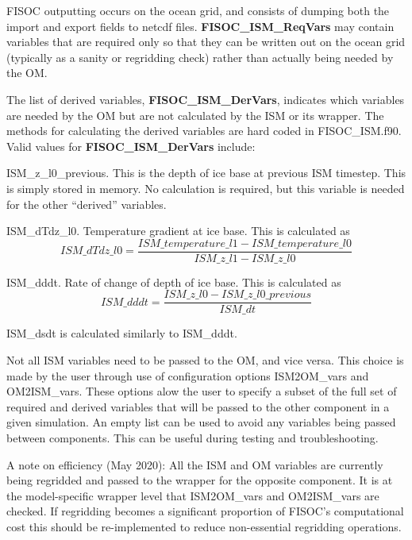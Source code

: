 \documentclass[11pt]{article}
\begin{document}
FISOC outputting occurs on the ocean grid, and consists of dumping both the import and 
export fields to netcdf files. 
\textbf{FISOC\_ISM\_ReqVars} may contain variables that are required only so that they can be written 
out on the ocean grid (typically as a sanity or regridding check) rather 
than actually being needed by the OM.

The list of derived variables, \textbf{FISOC\_ISM\_DerVars}, indicates which variables are needed by the 
OM but are not calculated by the ISM or its wrapper. 
The methods for calculating the derived variables are hard coded in FISOC\_ISM.f90. 
Valid values for  \textbf{FISOC\_ISM\_DerVars} include:

ISM\_z\_l0\_previous.  This is the depth of ice base at previous ISM timestep. This is simply stored 
in memory.  No calculation is required, but this variable is needed for the other ``derived'' variables. 

ISM\_dTdz\_l0.  Temperature gradient at ice base.  This is calculated as 
\begin{equation}
ISM\_dTdz\_l0 = \frac{ISM\_temperature\_l1 - ISM\_temperature\_l0}{ISM\_z\_l1 - ISM\_z\_l0}
\end{equation}

ISM\_dddt.  Rate of change of depth of ice base.  This is calculated as 
\begin{equation}
ISM\_dddt = \frac{ISM\_z\_l0 - ISM\_z\_l0\_previous}{ISM\_dt}
\end{equation}

ISM\_dsdt is calculated similarly to ISM\_dddt.

Not all ISM variables need to be passed to the OM, and vice versa.  
This choice is made by the 
user through use of configuration options ISM2OM\_vars and OM2ISM\_vars.  
These options alow the user to specify a subset of the full set of 
required and derived variables that will be passed to the other component 
in a given simulation.  An empty list can be used to avoid any variables 
being passed between components.  This can be useful during testing and 
troubleshooting.

A note on efficiency (May 2020): 
All the ISM and OM variables are currently being regridded and passed 
to the wrapper for the opposite component.  It is at the model-specific 
wrapper level that ISM2OM\_vars and OM2ISM\_vars are checked.  If regridding 
becomes a significant proportion of FISOC's computational cost this 
should be re-implemented to reduce non-essential regridding operations.
\end{document}
